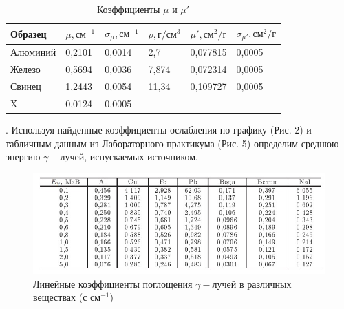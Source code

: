 \documentclass[a4paper,12pt]{article} %
\begin{document}
\medskip

\begin{table}[h!]
\begin{tabular}{|l|l|l|l|l|l|}
\hline
Образец  & $\mu, \text{см}^{-1}$ & $\sigma_{\mu}, \text{см}^{-1}$ & $\rho, \text{г}/\text{см}^3$ & $\mu', \text{см}^{2}/\text{г}$ & $\sigma_{\mu'}, \text{см}^{2}/\text{г}$ \\ \hline
Алюминий & 0,2101                & 0,0014                         & 2,7                          & 0,077815                       & 0,0005                                  \\ \hline
Железо   & 0,5694                & 0,0036                         & 7,874                        & 0,072314                       & 0,0005                                  \\ \hline
Свинец   & 1,2443                & 0,0054                         & 11,34                        & 0,109727                       & 0,0005                                  \\ \hline
X        & 0,0124                & 0,0005                         & -                            & -                              & -                                       \\ \hline
\end{tabular}

\caption{Коэффициенты $\mu$ и $\mu'$}
\end{table}

\medskip

. Используя найденные коэффициенты ослабления по графику (Рис. 2) и табличным данным из Лабораторного практикума (Рис. 5) определим среднюю энергию $\gamma-$лучей, испускаемых источником.

\medskip

\begin{figure}[h!]
		\centering
		\includegraphics[width=0.90\linewidth]{энергии.jpg}
		\caption{Линейные коэффициенты поглощения $\gamma-$лучей в различных веществах (с см$^{-1}$)}
		
	\end{figure}
\end{document}
